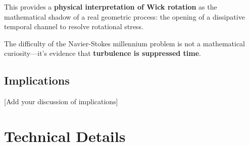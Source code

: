 \documentclass[11pt]{article}
\begin{document}
This provides a \textbf{physical interpretation of Wick rotation} as the mathematical shadow of a real geometric process: the opening of a dissipative temporal channel to resolve rotational stress.

The difficulty of the Navier-Stokes millennium problem is not a mathematical curiosity---it's evidence that \textbf{turbulence is suppressed time}.

\subsection{Implications}

[Add your discussion of implications]




\appendix
\section{Technical Details}




\end{document}

